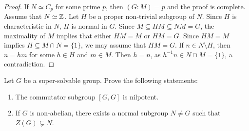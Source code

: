 \begin{proof}
If $N\simeq C_p$ for some prime $p$, then $(G:M)=p$ and the proof is complete. 
Assume that $N\simeq\mathbb{Z}$. Let $H$ be a proper non-trivial subgroup of $N$. Since 
$H$ is characteristic in $N$, $H$ is normal in $G$. Since 
$M\subseteq HM\subseteq NM=G$, the maximality of $M$ implies that either $HM=M$ or 
$HM=G$. Since $HM=M$ implies $H\subseteq M\cap N=\{1\}$,
we may assume that $HM=G$. If $n\in N\setminus H$, then $n=hm$ for some 
$h\in H$ and $m\in M$. Then $h=n$, as $h^{-1}n\in N\cap M=\{1\}$, a contradiction. 

\end{proof}

\begin{exercise}
    Let $G$ be a super-solvable group. Prove the following statements:
    \begin{enumerate}
        \item The commutator subgroup $[G,G]$ is nilpotent. 
        \item If $G$ is non-abelian, there exists a normal subgroup $N\ne G$ such that
	$Z(G)\subsetneq N$.
    \end{enumerate}
\end{exercise}

